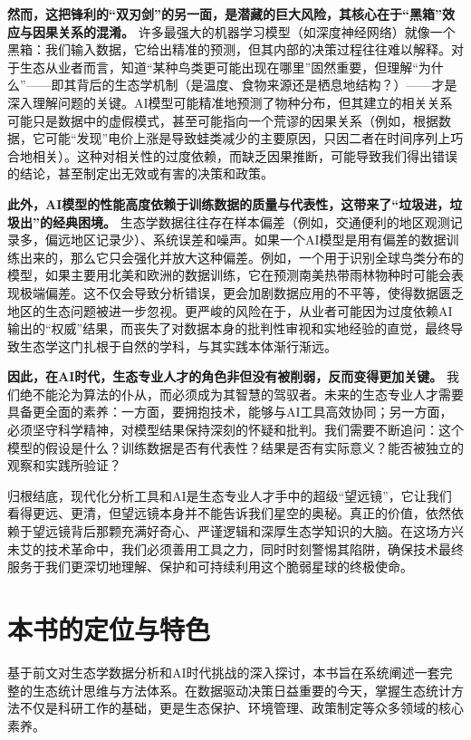 \documentclass[
  twoside,12pt,fontset=none]{ctexbook}
\begin{document}
\textbf{然而，这把锋利的``双刃剑''的另一面，是潜藏的巨大风险，其核心在于``黑箱''效应与因果关系的混淆。} 许多最强大的机器学习模型（如深度神经网络）就像一个黑箱：我们输入数据，它给出精准的预测，但其内部的决策过程往往难以解释。对于生态从业者而言，知道``某种鸟类更可能出现在哪里''固然重要，但理解``为什么''------即其背后的生态学机制（是温度、食物来源还是栖息地结构？）------才是深入理解问题的关键。AI模型可能精准地预测了物种分布，但其建立的相关关系可能只是数据中的虚假模式，甚至可能指向一个荒谬的因果关系（例如，根据数据，它可能``发现''电价上涨是导致蛙类减少的主要原因，只因二者在时间序列上巧合地相关）。这种对相关性的过度依赖，而缺乏因果推断，可能导致我们得出错误的结论，甚至制定出无效或有害的决策和政策。

\textbf{此外，AI模型的性能高度依赖于训练数据的质量与代表性，这带来了``垃圾进，垃圾出''的经典困境。} 生态学数据往往存在样本偏差（例如，交通便利的地区观测记录多，偏远地区记录少）、系统误差和噪声。如果一个AI模型是用有偏差的数据训练出来的，那么它只会强化并放大这种偏差。例如，一个用于识别全球鸟类分布的模型，如果主要用北美和欧洲的数据训练，它在预测南美热带雨林物种时可能会表现极端偏差。这不仅会导致分析错误，更会加剧数据应用的不平等，使得数据匮乏地区的生态问题被进一步忽视。更严峻的风险在于，从业者可能因为过度依赖AI输出的``权威''结果，而丧失了对数据本身的批判性审视和实地经验的直觉，最终导致生态学这门扎根于自然的学科，与其实践本体渐行渐远。

\textbf{因此，在AI时代，生态专业人才的角色非但没有被削弱，反而变得更加关键。} 我们绝不能沦为算法的仆从，而必须成为其智慧的驾驭者。未来的生态专业人才需要具备更全面的素养：一方面，要拥抱技术，能够与AI工具高效协同；另一方面，必须坚守科学精神，对模型结果保持深刻的怀疑和批判。我们需要不断追问：这个模型的假设是什么？训练数据是否有代表性？结果是否有实际意义？能否被独立的观察和实践所验证？

归根结底，现代化分析工具和AI是生态专业人才手中的超级``望远镜''，它让我们看得更远、更清，但望远镜本身并不能告诉我们星空的奥秘。真正的价值，依然依赖于望远镜背后那颗充满好奇心、严谨逻辑和深厚生态学知识的大脑。在这场方兴未艾的技术革命中，我们必须善用工具之力，同时时刻警惕其陷阱，确保技术最终服务于我们更深切地理解、保护和可持续利用这个脆弱星球的终极使命。

\hypertarget{ux672cux4e66ux7684ux5b9aux4f4dux4e0eux7279ux8272}{%
\section{本书的定位与特色}\label{ux672cux4e66ux7684ux5b9aux4f4dux4e0eux7279ux8272}}

基于前文对生态学数据分析和AI时代挑战的深入探讨，本书旨在系统阐述一套完整的生态统计思维与方法体系。在数据驱动决策日益重要的今天，掌握生态统计方法不仅是科研工作的基础，更是生态保护、环境管理、政策制定等众多领域的核心素养。
\end{document}
